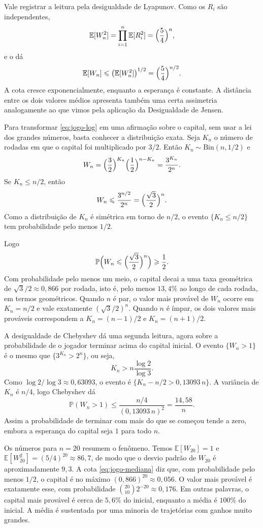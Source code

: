 \documentclass[12pt,portuguese]{article}
\theoremstyle{definition}
\theoremstyle{plainexercise}
\theoremstyle{starredexercise}
\theoremstyle{definition}
\begin{document}
Vale registrar a leitura pela desigualdade de Lyapunov. Como os $R_i$ são
independentes,
\[
\mathbb{E}[W_n^2]=\prod_{i=1}^{n}\mathbb{E}[R_i^2]
=\Bigl(\frac{5}{4}\Bigr)^{n},
\]
e o  dá
\[
\mathbb{E}[W_n]\leqslant\bigl(\mathbb{E}[W_n^2]\bigr)^{1/2}
=\Bigl(\frac{5}{4}\Bigr)^{n/2}.
\]
A cota cresce exponencialmente, enquanto a esperança é constante. A distância entre
os dois valores médios apresenta também uma certa assimetria  
analogamente ao que vimos pela aplicação da Desigualdade de Jensen.

Para transformar \eqref{eq:jogo-log} em uma afirmação sobre o capital, sem
usar a lei dos grandes números, basta conhecer a distribuição exata. Seja
$K_n$ o número de rodadas em que o capital foi multiplicado por $3/2$. Então
$K_n\sim\mathrm{Bin}(n,1/2)$ e
\[
W_n=\Bigl(\frac{3}{2}\Bigr)^{K_n}\Bigl(\frac{1}{2}\Bigr)^{n-K_n}
=
\frac{3^{K_n}}{2^n}.
\]
Se $K_n\leqslant n/2$, então
\[
W_n\leqslant\frac{3^{n/2}}{2^n}
=
\Bigl(\frac{\sqrt3}{2}\Bigr)^{n}.
\]
Como a distribuição de $K_n$ é simétrica em torno de $n/2$, o evento
$\{K_n\leqslant n/2\}$ tem probabilidade pelo menos $1/2$. 

Logo
\begin{equation}\label{eq:jogo-mediana}
\mathbb{P}\Bigl(W_n\leqslant\Bigl(\frac{\sqrt3}{2}\Bigr)^{n}\Bigr)
\geqslant\frac{1}{2}.
\end{equation}
Com probabilidade pelo menos um meio, o capital decai a uma taxa geométrica de
$\sqrt3/2\approx0{,}866$ por rodada, isto é, pelo menos $13{,}4\%$ ao longo de
cada rodada, em termos geométricos. Quando $n$ é par, o valor mais provável de
$W_n$ ocorre em $K_n=n/2$ e vale exatamente $(\sqrt3/2)^n$. Quando $n$ é
ímpar, os dois valores mais prováveis correspondem a
$K_n=(n-1)/2$ e $K_n=(n+1)/2$.

A desigualdade de Chebyshev dá uma segunda leitura, agora sobre a
probabilidade de o jogador terminar acima do capital inicial. O evento
$\{W_n>1\}$ é o mesmo que $\{3^{K_n}>2^n\}$, ou seja,
\[
K_n>n\frac{\log2}{\log3}.
\]
Como $\log2/\log3\approx0{,}63093$, o evento é
$\{K_n-n/2>0{,}13093\,n\}$. A variância de $K_n$ é $n/4$, logo Chebyshev dá
\begin{equation}\label{eq:jogo-chebyshev}
\mathbb{P}(W_n>1)
\leqslant
\frac{n/4}{(0{,}13093\,n)^2}
=
\frac{14{,}58}{n}.
\end{equation}
Assim a probabilidade de terminar com mais do que se começou tende a zero,
embora a esperança do capital seja $1$ para todo $n$.

Os números para $n=20$ resumem o fenômeno. Temos $\mathbb{E}[W_{20}]=1$ e
$\mathbb{E}[W_{20}^2]=(5/4)^{20}\approx86{,}7$, de modo que o desvio padrão de
$W_{20}$ é aproximadamente $9{,}3$. A cota \eqref{eq:jogo-mediana} diz que, com
probabilidade pelo menos $1/2$, o capital é no máximo
$(0{,}866)^{20}\approx0{,}056$. O valor mais provável é exatamente esse, com
probabilidade $\binom{20}{10}2^{-20}\approx0{,}176$. Em outras palavras, o
capital mais provável é cerca de $5{,}6\%$ do inicial, enquanto a média é
$100\%$ do inicial. A média é sustentada por uma minoria de trajetórias com
ganhos muito grandes.
\end{document}

